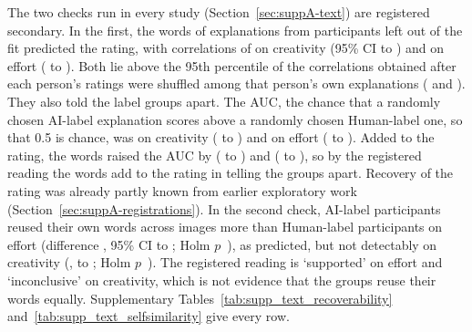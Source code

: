 The two checks run in every study (Section~\ref{sec:suppA-text}) are registered secondary. In the first, the words of explanations from participants left out of the fit predicted the rating, with correlations of \SOneTextRecRatingCreat{} on creativity (95\% CI \SOneTextRecRatingCreatLo{} to \SOneTextRecRatingCreatHi) and \SOneTextRecRatingEff{} on effort (\SOneTextRecRatingEffLo{} to \SOneTextRecRatingEffHi). Both lie above the 95th percentile of the correlations obtained after each person's ratings were shuffled among that person's own explanations (\SOneTextRecRatingCreatNull{} and \SOneTextRecRatingEffNull). They also told the label groups apart. The AUC, the chance that a randomly chosen AI-label explanation scores above a randomly chosen Human-label one, so that 0.5 is chance, was \SOneTextRecArmCreat{} on creativity (\SOneTextRecArmCreatLo{} to \SOneTextRecArmCreatHi) and \SOneTextRecArmEff{} on effort (\SOneTextRecArmEffLo{} to \SOneTextRecArmEffHi). Added to the rating, the words raised the AUC by \SOneTextRecIncrCreat{} (\SOneTextRecIncrCreatLo{} to \SOneTextRecIncrCreatHi) and \SOneTextRecIncrEff{} (\SOneTextRecIncrEffLo{} to \SOneTextRecIncrEffHi), so by the registered reading the words add to the rating in telling the groups apart. Recovery of the rating was already partly known from earlier exploratory work (Section~\ref{sec:suppA-registrations}). In the second check, AI-label participants reused their own words across images more than Human-label participants on effort (difference \SOneTextOverlapEffDiff, 95\% CI \SOneTextOverlapEffLo{} to \SOneTextOverlapEffHi; Holm $p$~\SOneTextOverlapEffPHolm), as predicted, but not detectably on creativity (\SOneTextOverlapCreatDiff, \SOneTextOverlapCreatLo{} to \SOneTextOverlapCreatHi; Holm $p$~\SOneTextOverlapCreatPHolm). The registered reading is `supported' on effort and `inconclusive' on creativity, which is not evidence that the groups reuse their words equally. Supplementary Tables~\ref{tab:supp_text_recoverability} and~\ref{tab:supp_text_selfsimilarity} give every row.




